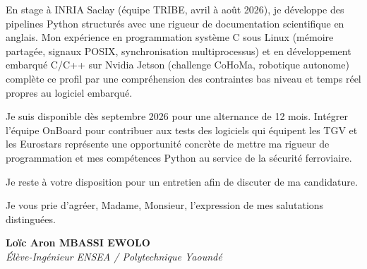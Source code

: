 \documentclass[a4paper,11pt]{article}
\begin{document}
En stage à INRIA Saclay (équipe TRIBE, avril à août 2026), je développe des pipelines Python structurés avec une rigueur de documentation scientifique en anglais. Mon expérience en programmation système C sous Linux (mémoire partagée, signaux POSIX, synchronisation multiprocessus) et en développement embarqué C/C++ sur Nvidia Jetson (challenge CoHoMa, robotique autonome) complète ce profil par une compréhension des contraintes bas niveau et temps réel propres au logiciel embarqué.

Je suis disponible dès septembre 2026 pour une alternance de 12 mois. Intégrer l'équipe OnBoard pour contribuer aux tests des logiciels qui équipent les TGV et les Eurostars représente une opportunité concrète de mettre ma rigueur de programmation et mes compétences Python au service de la sécurité ferroviaire.

Je reste à votre disposition pour un entretien afin de discuter de ma candidature.

Je vous prie d'agréer, Madame, Monsieur, l'expression de mes salutations distinguées.

\vspace{0.8cm}

\textbf{Loïc Aron MBASSI EWOLO}\\
\textit{Élève-Ingénieur ENSEA / Polytechnique Yaoundé}
\end{document}
